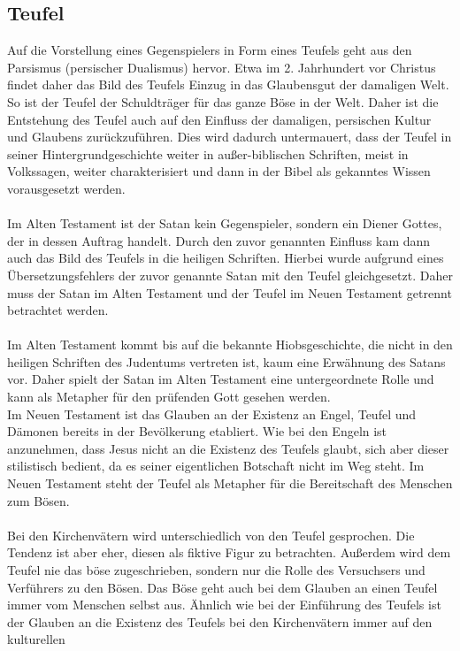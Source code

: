 \subsection{Teufel}\label{sec:Teufel}
Auf die Vorstellung eines Gegenspielers in Form eines Teufels geht aus den Parsismus (persischer Dualismus) hervor. Etwa im 2. Jahrhundert vor Christus findet 
daher das Bild des Teufels Einzug in das Glaubensgut der damaligen Welt. So ist der Teufel der Schuldträger für das ganze Böse in der Welt. Daher ist die Entstehung
des Teufel auch auf den Einfluss der damaligen, persischen Kultur und Glaubens zurückzuführen. Dies wird dadurch untermauert, dass der Teufel in seiner 
Hintergrundgeschichte weiter in außer-biblischen Schriften, meist in Volkssagen, weiter charakterisiert und dann in der Bibel als gekanntes Wissen vorausgesetzt werden.
\\~\\
Im Alten Testament ist der Satan kein Gegenspieler, sondern ein Diener Gottes, der in dessen Auftrag handelt. Durch den zuvor genannten Einfluss kam 
dann auch das Bild des Teufels in die heiligen Schriften. Hierbei wurde aufgrund eines Übersetzungsfehlers der zuvor genannte Satan mit den Teufel gleichgesetzt.
Daher muss der Satan im Alten Testament und der Teufel im Neuen Testament getrennt betrachtet werden.
\\~\\
Im Alten Testament kommt bis auf die bekannte Hiobsgeschichte, die nicht in den heiligen Schriften des Judentums vertreten ist, kaum eine Erwähnung des Satans 
vor. Daher spielt der Satan im Alten Testament eine untergeordnete Rolle und kann als Metapher für den prüfenden Gott gesehen werden. \\ Im Neuen Testament 
ist das Glauben an der Existenz an Engel, Teufel und Dämonen bereits in der Bevölkerung etabliert. Wie bei den Engeln ist anzunehmen, dass Jesus nicht an die Existenz 
des Teufels glaubt, sich aber dieser stilistisch bedient, da es seiner eigentlichen Botschaft nicht im Weg steht. Im Neuen Testament steht der Teufel als Metapher
für die Bereitschaft  des Menschen zum Bösen. 
\\~\\
Bei den Kirchenvätern wird unterschiedlich von den Teufel gesprochen. Die Tendenz ist aber eher, diesen als fiktive Figur zu betrachten. Außerdem wird dem Teufel 
nie das böse zugeschrieben, sondern nur die Rolle des Versuchsers und Verführers zu den Bösen. Das Böse geht auch bei dem Glauben an einen Teufel immer 
vom Menschen selbst aus. Ähnlich wie bei der Einführung des Teufels ist der Glauben an die Existenz des Teufels bei den Kirchenvätern immer auf den kulturellen 
